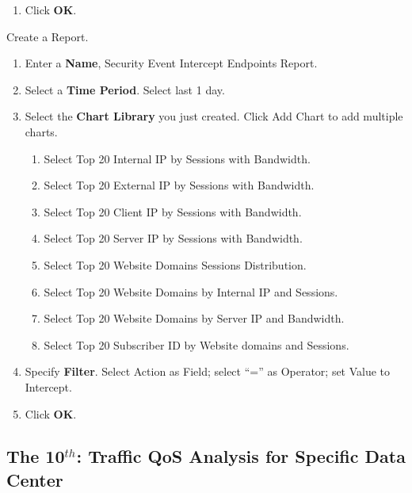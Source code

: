 \begin{description}
\begin{enumerate}
\begin{enumerate}
            \item	Click \textbf{OK}.
        \end{enumerate}
    \end{enumerate}
    \item[STEP 3.]	Create a Report. 
    \begin{enumerate}
        \item Enter a \textbf{Name}, Security Event Intercept Endpoints Report. 
        \item Select a \textbf{Time Period}. Select last 1 day.
        \item Select the \textbf{Chart Library} you just created. Click Add Chart to add multiple charts.
        \begin{enumerate}
            \item	Select Top 20 Internal IP by Sessions with Bandwidth. 
            \item	Select Top 20 External IP by Sessions with Bandwidth.
            \item	Select Top 20 Client IP by Sessions with Bandwidth.
            \item	Select Top 20 Server IP by Sessions with Bandwidth.
            \item	Select Top 20 Website Domains Sessions Distribution.
            \item	Select Top 20 Website Domains by Internal IP and Sessions.
            \item	Select Top 20 Website Domains by Server IP and Bandwidth.
            \item	Select Top 20 Subscriber ID by Website domains and Sessions.
        \end{enumerate}
        \item Specify \textbf{Filter}. Select Action as Field; select “=” as Operator; set Value to Intercept. 
        \item Click \textbf{OK}.
    \end{enumerate}
\end{description}

\subsection*{\hypertarget{link:The 10th: Traffic QoS Analysis for Specific Data Center }{The 10$^{th}$: Traffic QoS Analysis for Specific Data Center }}
\label{sec:appendix_f:report:10th}

